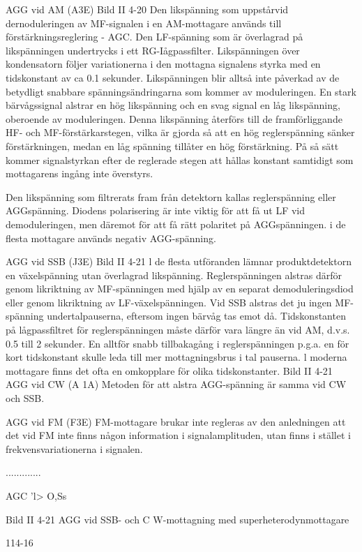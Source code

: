 AGG vid AM (A3E)
Bild II 4-20
Den likspänning som uppstårvid dernoduleringen av MF-signalen i en AM-mottagare
används till förstärkningsreglering - AGC.
Den LF-spänning som är överlagrad på
likspänningen undertrycks i ett RG-Iågpassfilter. Likspänningen över kondensatorn följer variationerna i den mottagna signalens
styrka med en tidskonstant av ca 0.1 sekunder. Likspänningen blir alltså inte påverkad
av de betydligt snabbare spänningsändringarna som kommer av moduleringen.
En stark bärvågssignal alstrar en hög
likspänning och en svag signal en låg likspänning, oberoende av moduleringen.
Denna likspänning återförs till de framförliggande HF- och MF-förstärkarstegen, vilka
är gjorda så att en hög reglerspänning sänker förstärkningen, medan en låg spänning
tillåter en hög förstärkning.
På så sätt kommer signalstyrkan efter de
reglerade stegen att hållas konstant samtidigt som mottagarens ingång inte överstyrs.

Den likspänning som filtrerats fram från
detektorn kallas reglerspänning eller AGGspänning. Diodens polarisering är inte viktig
för att få ut LF vid demoduleringen, men
däremot för att få rätt polaritet på AGGspänningen. i de flesta mottagare används
negativ AGG-spänning.

AGG vid SSB (J3E)
Bild II 4-21
l de flesta utföranden lämnar produktdetektorn en växelspänning utan överlagrad likspänning. Reglerspänningen alstras därför
genom likriktning av MF-spänningen med
hjälp av en separat demoduleringsdiod eller
genom likriktning av LF-växelspänningen.
Vid SSB alstras det ju ingen MF-spänning undertalpauserna, eftersom ingen bärvåg tas emot då. Tidskonstanten på lågpassfiltret för reglerspänningen måste därför vara längre än vid AM, d.v.s. 0.5 till 2
sekunder. En alltför snabb tillbakagång i
reglerspänningen p.g.a. en för kort tidskonstant skulle leda till mer mottagningsbrus i
tal pauserna. l moderna mottagare finns det
ofta en omkopplare för olika tidskonstanter.
Bild II 4-21
AGG vid CW (A 1A)
Metoden för att alstra AGG-spänning är
samma vid CW och SSB.

AGG vid FM (F3E)
FM-mottagare brukar inte regleras av den
anledningen att det vid FM inte finns någon
information i signalamplituden, utan finns i
stället i frekvensvariationerna i signalen.

.............

AGC
'l> O,Ss

Bild II 4-21 AGG vid SSB- och C W-mottagning med superheterodynmottagare

114-16

